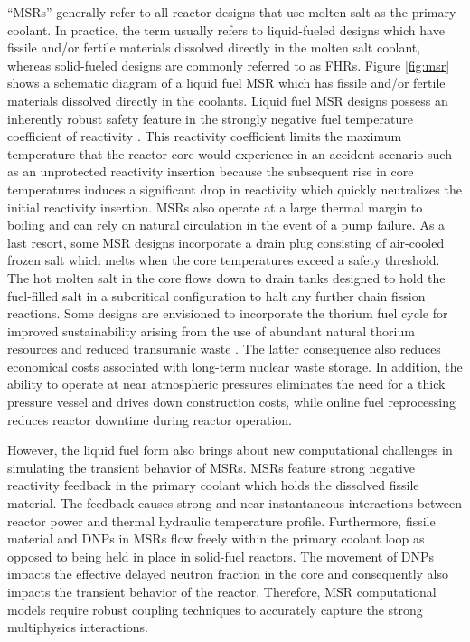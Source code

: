 ``\glspl{MSR}'' generally refer to all reactor designs that use molten salt as
the primary coolant. In practice, the term usually refers to liquid-fueled
designs which have fissile and/or fertile materials dissolved directly in the
molten salt coolant, whereas solid-fueled designs are commonly referred to as
\glspl{FHR}. Figure \ref{fig:msr} shows a schematic diagram of a liquid
fuel \gls{MSR} which has fissile and/or fertile materials dissolved directly in
the coolants. Liquid fuel \gls{MSR} designs possess an inherently robust
safety feature in the strongly negative fuel temperature coefficient of
reactivity \cite{elsheikh_safety_2013}. This reactivity coefficient limits the
maximum temperature that the reactor core would experience in an accident
scenario such as an unprotected reactivity insertion because the subsequent
rise in core temperatures induces a significant drop in reactivity which
quickly neutralizes the initial reactivity insertion. \glspl{MSR} also
operate at a large thermal margin to boiling and can rely on natural
circulation in the event of a pump failure. As a last resort, some \gls{MSR}
designs incorporate a drain plug consisting of air-cooled frozen salt which
melts when the core temperatures exceed a safety threshold. The hot molten salt
in the core flows down to drain tanks designed to hold the fuel-filled salt in
a subcritical configuration to halt any further chain fission reactions.
Some designs are envisioned to
incorporate the thorium fuel cycle for improved sustainability arising from the
use of abundant natural thorium resources and reduced transuranic waste
\cite{heuer_towards_2014}. The latter consequence also reduces economical costs
associated with long-term nuclear waste storage. In addition, the ability to
operate at near atmospheric pressures eliminates the need for a thick pressure
vessel and drives down construction costs, while online fuel reprocessing
reduces reactor downtime during reactor operation.

However, the liquid fuel form also brings about new computational
challenges in simulating the transient behavior of \glspl{MSR}. \glspl{MSR}
feature strong negative reactivity feedback in the primary coolant which holds
the dissolved fissile material. The feedback causes strong and
near-instantaneous interactions between reactor power and thermal hydraulic
temperature profile. Furthermore, fissile material
and \glspl{DNP} in \glspl{MSR} flow freely within the primary coolant
loop as opposed to being held in place in solid-fuel reactors. The movement of
\glspl{DNP} impacts the effective delayed neutron fraction in the core and
consequently also impacts the transient behavior of the reactor. Therefore,
\gls{MSR} computational models require robust coupling techniques to accurately
capture the strong multiphysics interactions.

